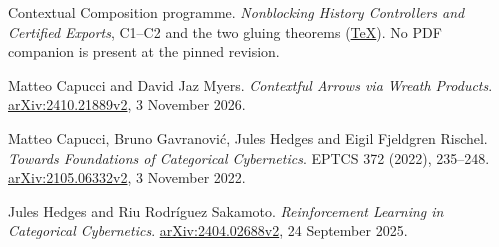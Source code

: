 \documentclass[11pt]{article}
\newcommand{\reposrc}[2]{\href{https://github.com/eternal-november/eos-research-programmes/blob/2de56b5541a5e67d44353e58d138978d31c5901c/projects/contextual-composition/#1}{#2}}
\begin{document}
\begin{thebibliography}{10}
Contextual Composition programme.
\emph{Nonblocking History Controllers and Certified Exports}, C1--C2 and the two gluing theorems
(\reposrc{foundations/native-whole-scope-feedback/Nonblocking_History_Controllers_and_Certified_Exports.tex}{TeX}).
No PDF companion is present at the pinned revision.

Matteo Capucci and David Jaz Myers.
\emph{Contextful Arrows via Wreath Products}.
\href{https://arxiv.org/abs/2410.21889v2}{arXiv:2410.21889v2}, 3 November 2026.

Matteo Capucci, Bruno Gavranovi\'c, Jules Hedges and Eigil Fjeldgren Rischel.
\emph{Towards Foundations of Categorical Cybernetics}.
EPTCS 372 (2022), 235--248.
\href{https://arxiv.org/abs/2105.06332v2}{arXiv:2105.06332v2}, 3 November 2022.

Jules Hedges and Riu Rodr\'iguez Sakamoto.
\emph{Reinforcement Learning in Categorical Cybernetics}.
\href{https://arxiv.org/abs/2404.02688v2}{arXiv:2404.02688v2}, 24 September 2025.
\end{thebibliography}
\end{document}
